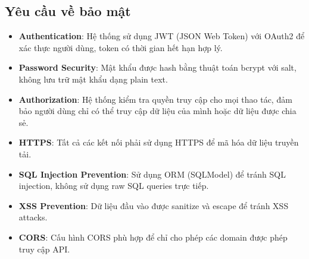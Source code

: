 \documentclass[../DoAn.tex]{subfiles}
\begin{document}
\subsection{Yêu cầu về bảo mật}
\begin{itemize}
    \item \textbf{Authentication}: Hệ thống sử dụng JWT (JSON Web Token) với OAuth2 để xác thực người dùng, token có thời gian hết hạn hợp lý.
    \item \textbf{Password Security}: Mật khẩu được hash bằng thuật toán bcrypt với salt, không lưu trữ mật khẩu dạng plain text.
    \item \textbf{Authorization}: Hệ thống kiểm tra quyền truy cập cho mọi thao tác, đảm bảo người dùng chỉ có thể truy cập dữ liệu của mình hoặc dữ liệu được chia sẻ.
    \item \textbf{HTTPS}: Tất cả các kết nối phải sử dụng HTTPS để mã hóa dữ liệu truyền tải.
    \item \textbf{SQL Injection Prevention}: Sử dụng ORM (SQLModel) để tránh SQL injection, không sử dụng raw SQL queries trực tiếp.
    \item \textbf{XSS Prevention}: Dữ liệu đầu vào được sanitize và escape để tránh XSS attacks.
    \item \textbf{CORS}: Cấu hình CORS phù hợp để chỉ cho phép các domain được phép truy cập API.
\end{itemize}


\end{document}
